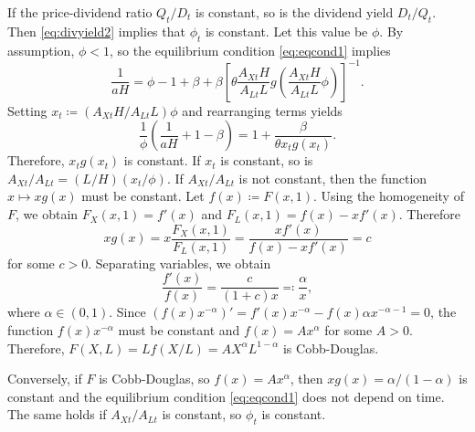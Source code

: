 \documentclass[a4paper,12pt]{article}
\numberwithin{equation}{section}
\theoremstyle{plain}
\begin{document}
If the price-dividend ratio $Q_t/D_t$ is constant, so is the dividend yield $D_t/Q_t$. Then \eqref{eq:divyield2} implies that $\phi_t$ is constant. Let this value be $\phi$. By assumption, $\phi<1$, so the equilibrium condition \eqref{eq:eqcond1} implies
\begin{equation*}
    \frac{1}{aH}=\phi-1+\beta+\beta\left[\theta\frac{A_{Xt}H}{A_{Lt}L}g\left(\frac{A_{Xt}H}{A_{Lt}L}\phi\right)\right]^{-1}.
\end{equation*}
Setting $x_t\coloneqq (A_{Xt}H/A_{Lt}L)\phi$ and rearranging terms yields
\begin{equation*}
    \frac{1}{\phi}\left(\frac{1}{aH}+1-\beta\right)=1+\frac{\beta}{\theta x_tg(x_t)}.
\end{equation*}
Therefore, $x_tg(x_t)$ is constant. If $x_t$ is constant, so is $A_{Xt}/A_{Lt}=(L/H)(x_t/\phi)$. If $A_{Xt}/A_{Lt}$ is not constant, then the function $x\mapsto xg(x)$ must be constant. Let $f(x)\coloneqq F(x,1)$. Using the homogeneity of $F$, we obtain $F_X(x,1)=f'(x)$ and $F_L(x,1)=f(x)-xf'(x)$. Therefore
\begin{equation*}
    xg(x)=x\frac{F_X(x,1)}{F_L(x,1)}=\frac{xf'(x)}{f(x)-xf'(x)}=c
\end{equation*}
for some $c>0$. Separating variables, we obtain
\begin{equation*}
    \frac{f'(x)}{f(x)}=\frac{c}{(1+c)x}\eqqcolon \frac{\alpha}{x},
\end{equation*}
where $\alpha\in (0,1)$. Since $(f(x)x^{-\alpha})'=f'(x)x^{-\alpha}-f(x)\alpha x^{-\alpha-1}=0$, the function $f(x)x^{-\alpha}$ must be constant and $f(x)=Ax^\alpha$ for some $A>0$. Therefore, $F(X,L)=Lf(X/L)=AX^\alpha L^{1-\alpha}$ is Cobb-Douglas.

Conversely, if $F$ is Cobb-Douglas, so $f(x)=Ax^\alpha$, then $xg(x)=\alpha/(1-\alpha)$ is constant and the equilibrium condition \eqref{eq:eqcond1} does not depend on time. The same holds if $A_{Xt}/A_{Lt}$ is constant, so $\phi_t$ is constant. \hfill \qedsymbol

\printbibliography
\end{document}

